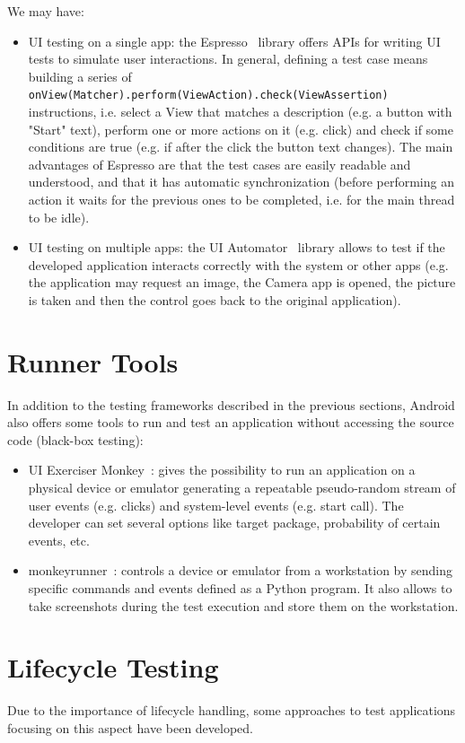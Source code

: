 \documentclass[11pt,a4paper,notitlepage]{article}
\begin{document}
We may have:
\begin{itemize}
	\item UI testing on a single app: the Espresso~\cite{Espresso} library offers APIs for writing UI tests to simulate user interactions. In general, defining a test case means building a series of \texttt{onView(Matcher).perform(ViewAction).check(ViewAssertion)} instructions, i.e. select a View that matches a description (e.g. a button with "Start" text), perform one or more actions on it (e.g. click) and check if some conditions are true (e.g. if after the click the button text changes). The main advantages of Espresso are that the test cases are easily readable and understood, and that it has automatic synchronization (before performing an action it waits for the previous ones to be completed, i.e. for the main thread to be idle).
	\item UI testing on multiple apps: the UI Automator~\cite{UIAutomator} library allows to test if the developed application interacts correctly with the system or other apps (e.g. the application may request an image, the Camera app is opened, the picture is taken and then the control goes back to the original application). 
\end{itemize}

\section{Runner Tools}
In addition to the testing frameworks described in the previous sections, Android also offers some tools to run and test an application without accessing the source code (black-box testing):
\begin{itemize}
	\item UI Exerciser Monkey~\cite{UIExerciserMonkey}: gives the possibility to run an application on a physical device or emulator generating a repeatable pseudo-random stream of user events (e.g. clicks) and system-level events (e.g. start call). The developer can set several options like target package, probability of certain events, etc.
	\item monkeyrunner~\cite{monkeyrunner}: controls a device or emulator from a workstation by sending specific commands and events defined as a Python program. It also allows to take screenshots during the test execution and store them on the workstation.
\end{itemize}

\section{Lifecycle Testing}
Due to the importance of lifecycle handling, some approaches to test applications focusing on this aspect have been developed.
\end{document}
